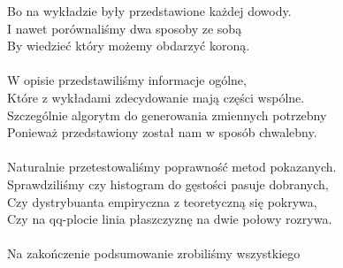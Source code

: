 \documentclass[12pt]{mwrep}
\begin{document}
	Bo na wykładzie były przedstawione każdej dowody.\\
	I nawet porównaliśmy dwa sposoby ze sobą\\
	By wiedzieć który możemy obdarzyć koroną.\\
	\\
	W opisie przedstawiliśmy informacje ogólne,\\
	Które z wykładami zdecydowanie mają części wspólne.\\
	Szczególnie algorytm do generowania zmiennych potrzebny\\
	Ponieważ przedstawiony został nam w sposób chwalebny.\\
	\\
	Naturalnie przetestowaliśmy poprawność metod pokazanych.\\
	Sprawdziliśmy czy histogram do gęstości pasuje dobranych,\\
	Czy dystrybuanta empiryczna z teoretyczną się pokrywa,\\
	Czy na qq-plocie linia płaszczyznę na dwie połowy rozrywa.\\
	\\
	Na zakończenie podsumowanie zrobiliśmy wszystkiego\\
\end{document}
